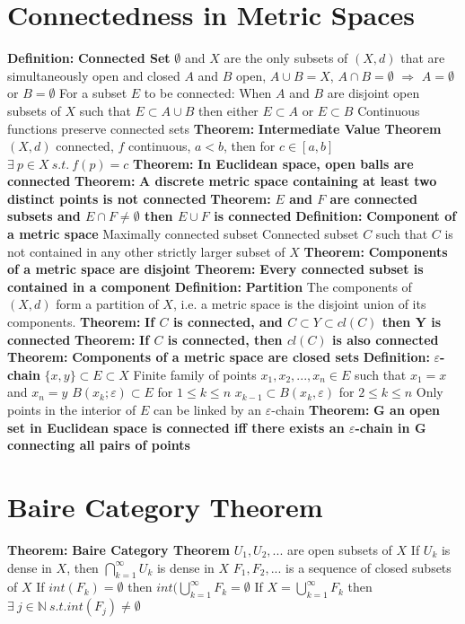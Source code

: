 \documentclass[14pt]{extarticle}
\def\Definition{{\color{Blue} \textbf{Definition:} }}
\def\Theorem{{\color{Red} \textbf{Theorem:} }}
\begin{document}
\begin{outline}
		\section{Connectedness in Metric Spaces}
		\1	\Definition \textbf{Connected Set}
			\2	$\emptyset$ and $X$ are the only subsets of $(X,d)$ that are simultaneously
					open and closed
			\2	$A$ and $B$ open, $A \cup B = X$, $A \cap B = \emptyset$ $\Rightarrow$
					$A = \emptyset$ or $B = \emptyset$
			\2	For a subset $E$ to be connected: 
					When $A$ and $B$ are disjoint open subsets of $X$ such that $E \subset A \cup B$
					then either $E \subset A$ or $E \subset B$
			\2	Continuous functions preserve connected sets
		\1	\Theorem \textbf{Intermediate Value Theorem}
			\2	$(X,d)$ connected, $f$ continuous, $a < b$, then for $c \in [a,b]$
			$\exists~p \in X~s.t.~f(p) = c$
		\1	\Theorem	\textbf{In Euclidean space, open balls are connected}
		\1	\Theorem	\textbf{A discrete metric space containing at least two
				distinct points is not connected}
		\1	\Theorem \textbf{$E$ and $F$ are connected subsets and $E \cap F \ne \emptyset$
						then $E \cup F$ is connected}
		\1	\Definition \textbf{Component of a metric space}
			\2	Maximally connected subset
			\2	Connected subset $C$ such that $C$ is not contained in any other 
					strictly larger subset of $X$
		\1	\Theorem	\textbf{Components of a metric space are disjoint}
		\1	\Theorem	\textbf{Every connected subset is contained in a component}
		\1	\Definition \textbf{Partition}
			\2	The components of $(X,d)$ form a partition of $X$, i.e. a metric space
					is the disjoint union of its components.
		\1	\Theorem \textbf{If $C$ is connected, and $C \subset Y \subset cl(C)$ then Y is connected}
		\1	\Theorem	\textbf{If $C$ is connected, then $cl(C)$ is also connected}
		\1	\Theorem	\textbf{Components of a metric space are closed sets}
		\1	\Definition \textbf{$\varepsilon$-chain}
			\2	$\{x,y\}\subset E \subset X$
			\2	Finite family of points $x_1,x_2,...,x_n \in E$ such that
				\3	$x_1 = x$ and $x_n = y$
				\3	$B(x_k;\varepsilon) \subset E$ for $1 \le k \le n$
				\3	$x_{k-1} \subset B(x_k,\varepsilon)$ for $2 \le k \le n$
			\2	Only points in the interior of $E$ can be linked by an $\varepsilon$-chain
		\1	\Theorem	\textbf{G an open set in Euclidean space is connected iff 
					there exists an $\varepsilon$-chain in G connecting all pairs of points}
		\section{Baire Category Theorem}
		\1	\Theorem	\textbf{Baire Category Theorem}
			\2	$U_1,U_2,...$ are open subsets of $X$
			\2	If $U_k$ is dense in $X$, then $\bigcap_{k=1}^{\infty} U_k$ is dense in $X$
			\2	$F_1,F_2,...$ is a sequence of closed subsets of $X$
			\2	If $int(F_k) = \emptyset$ then $int(\bigcup_{k=1}^{\infty} F_k = \emptyset$
			\2	If $X = \bigcup_{k=1}^{\infty} F_k$ then $\exists~j \in \mathbb{N}~s.t. int(F_j) \ne \emptyset$

\end{outline}
\end{document}
